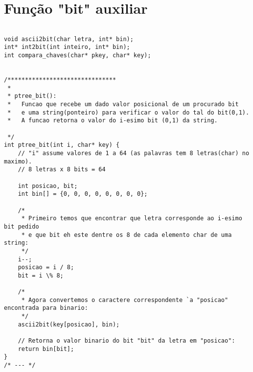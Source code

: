 \documentclass[a4paper,10pt]{article}
\begin{document}
\newpage
\section*{Fun\c c\~ao "bit" auxiliar}
\begin{verbatim}

void ascii2bit(char letra, int* bin);
int* int2bit(int inteiro, int* bin);
int compara_chaves(char* pkey, char* key);


/*******************************
 *
 * ptree_bit():
 *   Funcao que recebe um dado valor posicional de um procurado bit
 *   e uma string(ponteiro) para verificar o valor do tal do bit(0,1).
 *   A funcao retorna o valor do i-esimo bit (0,1) da string.

 */
int ptree_bit(int i, char* key) {
    // "i" assume valores de 1 a 64 (as palavras tem 8 letras(char) no maximo).
    // 8 letras x 8 bits = 64

    int posicao, bit;
    int bin[] = {0, 0, 0, 0, 0, 0, 0, 0};

    /*
     * Primeiro temos que encontrar que letra corresponde ao i-esimo bit pedido
     * e que bit eh este dentre os 8 de cada elemento char de uma string:
     */
    i--;
    posicao = i / 8;
    bit = i \% 8;

    /*
     * Agora convertemos o caractere correspondente `a "posicao" encontrada para binario:
     */
    ascii2bit(key[posicao], bin);

    // Retorna o valor binario do bit "bit" da letra em "posicao":
    return bin[bit];
}
/* --- */

\end{verbatim}
\end{document}
